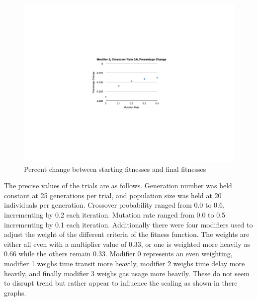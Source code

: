 \begin{figure}[h!]
	\hspace*{-2in}\includegraphics[width=10in]{images/FitMut03Per.png}\hspace*{0in}\vspace*{-2in}
	\caption{Percent change between starting fitnesses and final fitnesses}
	\label{Figure 6}
\end{figure}
\newpage
The precise values of the trials are as follows.  Generation number was held constant at 25 generations per trial, and population size was held at 20 individuals per generation.  Crossover probability ranged from 0.0 to 0.6, incrementing by 0.2 each iteration.  Mutation rate ranged from 0.0 to 0.5 incrementing by 0.1 each iteration.  Additionally there were four modifiers used to adjust the weight of the different criteria of the fitness function.  The weights are either all even with a multiplier value of 0.33, or one is weighted more heavily as 0.66 while the others remain 0.33.  Modifier 0 represents an even weighting, modifier 1 weighs time transit more heavily, modifier 2 weighs time delay more heavily, and finally modifier 3 weighs gas usage more heavily.  These do not seem to disrupt trend but rather appear to influence the scaling as shown in there graphs.

